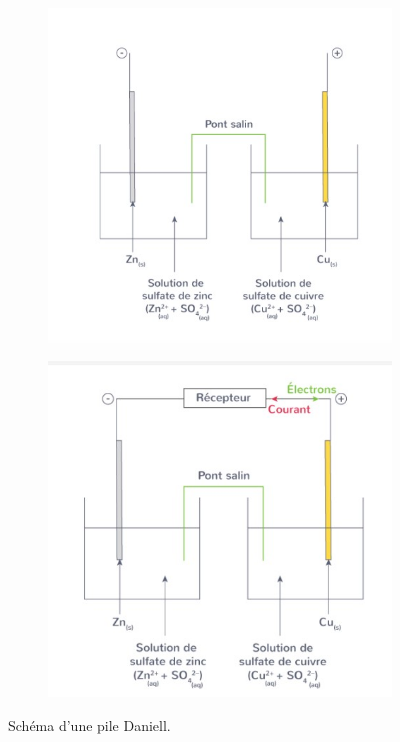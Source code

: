 \documentclass[11pt,a4paper]{article}
\begin{document}
\begin{figure}[ht]
\centering
\begin{subfigure}{.45\textwidth}
  \centering
  \includegraphics[width=.95\linewidth]{imgs/c2bis/dnaiell1.jpg}  
\end{subfigure}
\begin{subfigure}{.45\textwidth}
  \centering
  \includegraphics[width=.95\linewidth]{imgs/c2bis/daniell2.jpg}  
\end{subfigure}
\caption{Schéma d'une pile Daniell.}
\end{figure}
\end{document}
